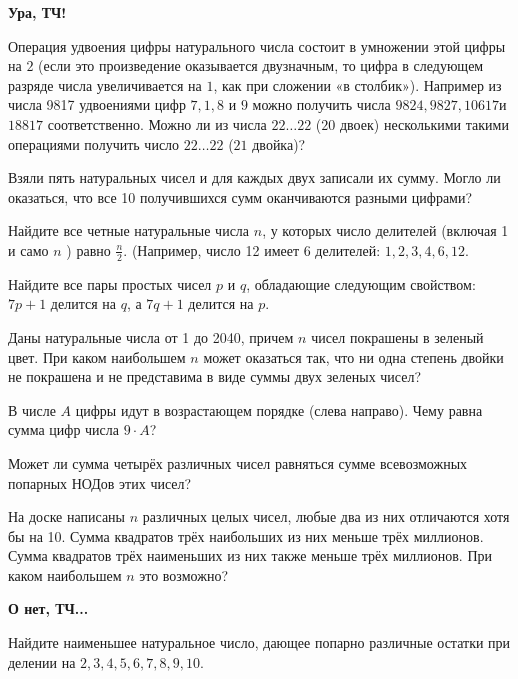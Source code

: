 \centerline{\bf \Huge Ура, ТЧ!}

\begin{flushright}
        \scriptsize{}
\end{flushright}

Операция удвоения цифры натурального числа состоит в умножении этой цифры на $2$ (если это произведение оказывается двузначным, то цифра в следующем разряде числа увеличивается на $1$, как при сложении «в столбик»). Например из числа 9817 удвоениями цифр $7, 1, 8$ и $9$ можно получить числа $9824, 9827, 10617 $и $18817$ соответственно. Можно ли из числа $22 \ldots 22$ ($20$ двоек) несколькими такими операциями получить число $22 \ldots 22$ ($21$ двойка)?

Взяли пять натуральных чисел и для каждых двух записали их сумму. Могло ли оказаться, что все 10 получившихся сумм оканчиваются разными цифрами?

Найдите все четные натуральные числа $n$, у которых число делителей (включая 1 и само $n$ ) равно $\frac{n}{2}$. (Например, число 12 имеет 6 делителей: $1,2,3,4,6,12$.

Найдите все пары простых чисел $p$ и $q$, обладающие следующим свойством: $7p + 1$ делится на $q$, а $7q + 1$ делится на $p.$

Даны натуральные числа от 1 до 2040, причем $n$ чисел покрашены в зеленый цвет. При каком наибольшем $n$ может оказаться так, что ни одна степень двойки не покрашена и не представима в виде суммы двух зеленых чисел?

В числе $A$ цифры идут в возрастающем порядке (слева направо). Чему равна сумма цифр числа $9\cdot A$?

 Может ли сумма четырёх различных чисел равняться сумме всевозможных попарных НОДов этих чисел?

На доске написаны $n$ различных целых чисел, любые два из них отличаются хотя бы на 10. Сумма квадратов трёх наибольших из них меньше трёх миллионов. Сумма квадратов трёх наименьших из них также меньше трёх миллионов. При каком наибольшем $n$ это возможно?

\newpage

\hspace{3mm}

\centerline{\bf \Huge О нет, ТЧ...}

Найдите наименьшее натуральное число, дающее попарно различные остатки при делении на $2, 3, 4, 5, 6, 7, 8, 9, 10$.

